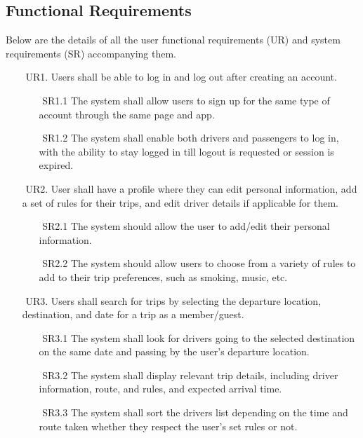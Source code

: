 \documentclass[a4paper, 12pt]{report} %
\begin{document}
        \subsection{Functional Requirements}
            Below are the details of all the user functional requirements (UR) and system requirements (SR) accompanying them.
           \begin{itemize}
                \item [$ $] UR1. Users shall be able to log in and log out after creating an account.
                \begin{itemize}
                    \item [$ $]SR1.1 The system shall allow users to sign up for the same type of account through the same page and app.
                    \item [$ $]SR1.2 The system shall enable both drivers and passengers to log in, with the ability to stay logged in till logout is requested or session is expired.
                \end{itemize}
                \item [$ $] UR2. User shall have a profile where they can edit personal information, add a set of rules for their trips, and edit driver details if applicable for them.
                \begin{itemize}
                    \item [$ $] SR2.1 The system should allow the user to add/edit their personal information.
                    \item [$ $] SR2.2 The system should allow users to choose from a variety of rules to add to their trip preferences, such as smoking, music, etc.
                \end{itemize}
                \item [$ $] UR3. Users shall search for trips by selecting the departure location, destination, and date for a trip as a member/guest.
                \begin{itemize}
                    \item [$ $] SR3.1 The system shall look for drivers going to the selected destination on the same date and passing by the user’s departure location.
                    \item [$ $] SR3.2 The system shall display relevant trip details, including driver information, route, and rules, and expected arrival time. 
                    \item [$ $] SR3.3 The system shall sort the drivers list depending on the time and route taken whether they respect the user’s set rules or not.

\end{itemize}
\end{itemize}
\end{document}
